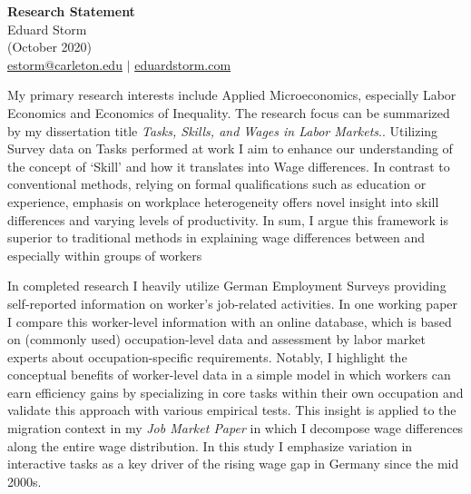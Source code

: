 \documentclass[a4paper,11pt]{article}
\begin{document}
	\thispagestyle{plain}
	
	\begin{center}
		{\Large \textbf{Research Statement}} \\
		Eduard Storm \\
		(October 2020) \\
		\href{mailto:estorm@carleton.edu}{estorm@carleton.edu} $|$ \href{https://eduardstorm.com/}{eduardstorm.com}
	\end{center}
	
	\noindent
	
	My primary research interests include Applied Microeconomics, especially Labor Economics and Economics of Inequality. The research focus can be summarized by my dissertation title \textit{Tasks, Skills, and Wages in Labor Markets}.. Utilizing Survey data on Tasks performed at work I aim to enhance our understanding of the concept of `Skill' and how it translates into Wage differences. In contrast to conventional methods, relying on formal qualifications such as education or experience, emphasis on workplace heterogeneity offers novel insight into skill differences and varying levels of productivity. In sum, I argue this framework is superior to traditional methods in explaining wage differences between and especially within groups of workers
	
	
	In completed research I heavily utilize German Employment Surveys providing self-reported information on worker's job-related activities. In one working paper I compare this worker-level information with an online database, which is based on (commonly used) occupation-level data and assessment by labor market experts about occupation-specific requirements. Notably, I highlight the conceptual benefits of worker-level data in a simple model in which workers can earn efficiency gains by specializing in core tasks within their own occupation and validate this approach with various empirical tests. This insight is applied to the migration context in my \textit{Job Market Paper} in which I decompose wage differences along the entire wage distribution. In this study I emphasize variation in interactive tasks as a key driver of the rising wage gap in Germany since the mid 2000s. 
	
\end{document}
